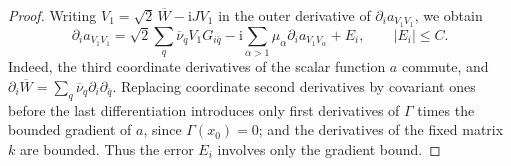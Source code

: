 \begin{proof}
Writing $V_1=\sqrt2\,\overline W-\mathrm iJV_1$ in the outer derivative of $\partial_ia_{V_1V_1}$, we obtain
\begin{equation}\label{eq:real-hessian-third-splitting}
 \partial_i a_{V_1V_1}
 =\sqrt2\sum_q\overline\nu_q V_1G_{i\bar q}
       -\mathrm i\sum_{\alpha>1}\mu_\alpha
                           \partial_i a_{V_1V_\alpha}+E_i,
 \qquad |E_i|\leq C.
\end{equation}
Indeed, the third coordinate derivatives of the scalar function $a$ commute, and $\partial_i\overline W=\sum_q\overline\nu_q\partial_i\partial_{\bar q}$. Replacing coordinate second derivatives by covariant ones before the last differentiation introduces only first derivatives of $\Gamma$ times the bounded gradient of $a$, since $\Gamma(x_0)=0$; and the derivatives of the fixed matrix $k$ are bounded. Thus the error $E_i$ involves only the gradient bound.


\end{proof}
